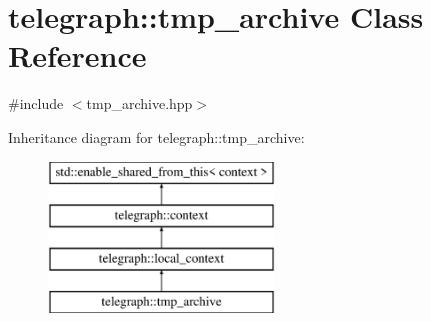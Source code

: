 \hypertarget{classtelegraph_1_1tmp__archive}{}\section{telegraph\+:\+:tmp\+\_\+archive Class Reference}
\label{classtelegraph_1_1tmp__archive}


{\ttfamily \#include $<$tmp\+\_\+archive.\+hpp$>$}

Inheritance diagram for telegraph\+:\+:tmp\+\_\+archive\+:\begin{figure}[H]
\begin{center}
\leavevmode
\includegraphics[height=4.000000cm]{classtelegraph_1_1tmp__archive}
\end{center}
\end{figure}
